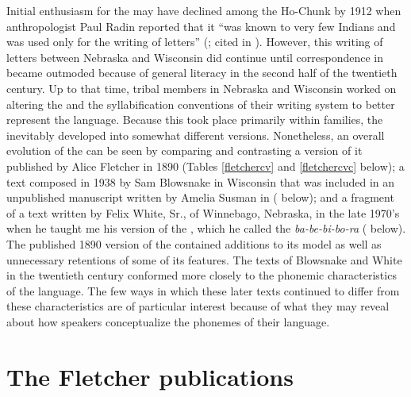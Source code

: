 \documentclass[output=paper]{LSP/langsci}
\begin{document}
Initial enthusiasm for the  may have declined among the Ho-Chunk by 1912 when anthropologist Paul Radin reported that it ``was known to very few Indians and was used only for the writing of letters'' (\citealt[21]{Radin1954}; cited in \citealt[161]{Walker1981}). However, this writing of letters between Nebraska and Wisconsin did continue until correspondence in  became outmoded because of general  literacy in the second half of the twentieth century. Up to that time, tribal members in Nebraska and Wisconsin worked on altering the  and the syllabification conventions of their writing system to better represent the  language. Because this took place primarily within families, the  inevitably developed into somewhat different versions. Nonetheless, an overall evolution of the   can be seen by comparing and contrasting a version of it published by Alice Fletcher in 1890 (Tables \ref{fletchercv} and \ref{fletchercvc} below); a  text composed in 1938 by Sam Blowsnake in Wisconsin that was included in an unpublished manuscript written by Amelia Susman in \citeyear{Susman1939} ( below); and a fragment of a text written by Felix White, Sr., of Winnebago, Nebraska, in the late 1970's when he taught me his version of the , which he called the \emph{ba-be-bi-bo-ra} ( below). The published 1890 version of the   contained additions to its  model as well as unnecessary retentions of some of its features. The texts of Blowsnake and White in the twentieth century conformed more closely to the phonemic characteristics of the  language. The few ways in which these later texts continued to differ from these characteristics are of particular interest because of what they may reveal about how  speakers conceptualize the phonemes of their language.

\section{The Fletcher publications}
\end{document}
